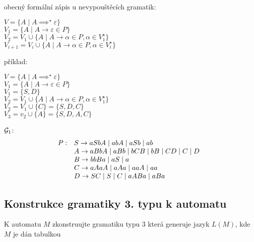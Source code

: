 obecný formální zápis u nevypouštěcích gramatik:

$V = \{A \mid A \implies^{\star} \varepsilon \}$\\
$V_1 = \{A \mid A \rightarrow \varepsilon \in P\}$\\
$V_2 = V_1 \cup \{A \mid A \rightarrow \alpha \in P, \alpha \in V_1^{\star}\}$\\
$V_{i+1} = V_i \cup \{A \mid A \rightarrow \alpha \in P, \alpha \in V_i^{\star}\}$\\

\begin{multicols}{2}
příklad: 

$V = \{A \mid A \implies^{\star} \varepsilon \}$\\
$V_1 = \{A \mid A \rightarrow \varepsilon \in P\}$\\
$V_1 = \{S, D\}$\\
$V_2 = V_1 \cup \{A \mid A \rightarrow \alpha \in P, \alpha \in V_1^{\star}\}$\\
$V_2 = V_1 \cup \{C\} = \{S, D, C\}$\\
$V_3 = v_2 \cup \{A\} = \{S, D, A, C\}$        


\columnbreak

$\mathcal{G}_1$:
    \[
    \begin{array}{l l}
        P: & S \rightarrow aSbA \mid abA \mid aSb \mid ab  \\
           & A \rightarrow aBbA \mid aBb \mid bCB \mid bB \mid CD \mid C \mid D \\
           & B \rightarrow bbBa \mid aS \mid a\\
           & C \rightarrow aAaA \mid aAa \mid aaA \mid aa \\
           & D \rightarrow SC \mid S \mid C \mid aABa \mid aBa \\
    \end{array}
\]

\end{multicols}


\subsection{Konstrukce gramatiky 3. typu k automatu}
\noindent
K automatu $M$ zkonstruujte gramatiku typu 3 která generuje jazyk $L(M)$, kde $M$
je dán tabulkou

